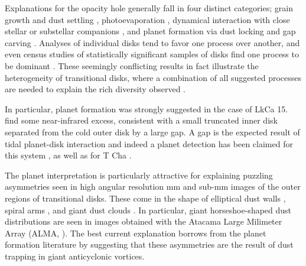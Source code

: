\documentclass[apj]{emulateapj}
\begin{document}

Explanations for the opacity hole generally fall in four distinct
categories; grain growth and dust settling \citep{Brauer07,Dominik-Dullemond08,Zsom11}, photoevaporation
\citep{Alexander06,Cieza08,Pascucci-Sterzik09,Owen10}, 
dynamical interaction with close stellar or substellar companions
\citep{Ireland-Kraus08}, and planet
formation via dust locking \citep{Safronov69,Lyttleton72,Goldreich-Ward73,Youdin-Shu02,Johansen07} and gap
carving \citep{Papaloizou-Lin84,Lin-Papaloizou86a,Lin-Papaloizou86b,Bryden99,Paardekooper-Mellema04,Quillen04,Najita07}. 
Analyses of individual disks \citep{Calvet04,Calvet05,Espaillat08} tend to favor one process over another, and even census
studies of statistically significant samples of disks find one process
to be dominant \citep{Najita07,Cieza08}. These
seemingly conflicting results in fact illustrate the
heterogeneity of transitional disks, where a combination of all
suggested processes are needed to explain the rich diversity observed 
\citep{Cieza10,Muzerolle10,Merin10,Clarke-Owen13}.   

In particular, planet formation was strongly suggested in
the case of LkCa 15. \citet{Espaillat08,Espaillat10} find some 
near-infrared excess, consistent with a small \citep{Pott10,Olofsson11} truncated inner disk separated from the cold
outer disk by a large gap. A gap is the expected result of tidal
planet-disk interaction 
\citep{Papaloizou-Lin84,Lin-Papaloizou86a,Lin-Papaloizou86b,Nelson00,Masset-Snellgrove01,Paardekooper-Mellema04,Quillen04,deValBorro06,Klahr-Kley06,Lyra09a,Zhu11,Kley12} 
and indeed a planet detection has been claimed for this system \citep{Muto12}, as well as for T Cha \citep{Huelamo11}.

 The planet interpretation is particularly attractive for explaining
puzzling asymmetries seen in high angular resolution  mm and sub-mm 
images of the outer regions of transitional disks. These come in the
shape of elliptical dust walls \citep{Isella12}, spiral arms
\citep{Muto12}, and giant dust clouds \citep{Oppenheimer08,Brown09}. In particular, giant horseshoe-shaped dust
distributions are seen in images obtained with the Atacama Large
Milimeter Array (ALMA, \citealt{Casassus12,Casassus13,vanderMarel13}). The best current
explanation borrows from the planet formation literature by suggesting that these asymmetries are the
result of dust trapping in giant anticyclonic vortices. 
\end{document}
